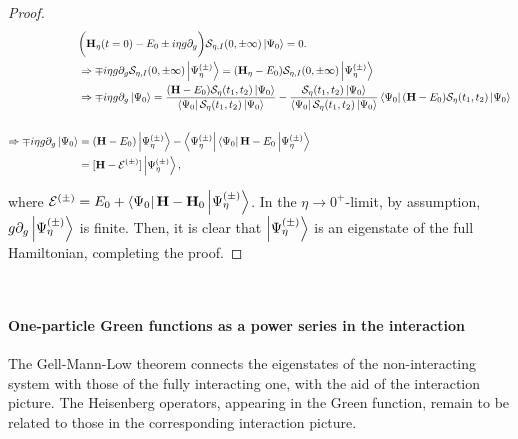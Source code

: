 \documentclass{homework}
\begin{document}
\begin{proof}
\begin{equation}
    \begin{split}
        &\bigg({\bf H}_{\eta}(t=0) - E_0 \pm i \eta g \partial_{g} \bigg) \mathcal{S}_{\eta, I}(0,\pm \infty) \ket{\Psi_0} = 0. \\
        &\Rightarrow \mp i \eta g \partial_{g} \mathcal{S}_{\eta, I}(0,\pm \infty) \ket{\Psi_{\eta}^{(\pm)}}= ({\bf H}_{\eta} - E_0)  \mathcal{S}_{\eta, I}(0,\pm \infty) \ket{\Psi_{\eta}^{(\pm)}}\\
        &\Rightarrow \mp i \eta g \partial_{g} \ket{\Psi_0}= \frac{({\bf H} - E_0) \mathcal{S}_{\eta}(t_1,t_2) \ket{\Psi_0} }{ \bra{\Psi_0} \mathcal{S}_{\eta}(t_1,t_2) \ket{\Psi_0}} - \frac{\mathcal{S}_{\eta}(t_1,t_2) \ket{\Psi_0}}{ \bra{\Psi_0} \mathcal{S}_{\eta}(t_1,t_2) \ket{\Psi_0}} \bra{\Psi_0} ({\bf H} - E_0) \mathcal{S}_{\eta}(t_1,t_2) \ket{\Psi_0}  \\
\\
\Rightarrow \mp i \eta g \partial_{g} \ket{\Psi_0} &= ({{\bf H}} - E_0) \ket{\Psi_{\eta}^{(\pm)}} -  \bra{\Psi_{\eta}^{(\pm)}} \bra{\Psi_0} {{\bf H}} - E_0  \ket{\Psi_{\eta}^{(\pm)}} \\
&= [{{\bf H}} -\mathcal{E}^{(\pm)}] \ket{\Psi_{\eta}^{(\pm)}},
    \end{split}
\end{equation}

where $\mathcal{E}^{(\pm)} = E_0 + \bra{\Psi_0} {{\bf H}} - {{\bf H}}_0  \ket{\Psi_{\eta}^{(\pm)}}$. In the $\eta \rightarrow 0^+$-limit, by assumption, $g \partial_{g} \ket{\Psi_{\eta}^{(\pm)}}$ is finite. Then, it is clear that $\ket{\Psi_{\eta}^{(\pm)}}$ is an eigenstate of the full Hamiltonian, completing the proof. 

\end{proof}

\blanky \\

\paragraph{One-particle Green functions as a power series in the interaction}

The Gell-Mann-Low theorem connects the eigenstates of the non-interacting system with those of the fully interacting one, with the aid of the interaction picture. The Heisenberg operators, appearing in the Green function, remain to be related to those in the corresponding interaction picture. \\
\end{document}
